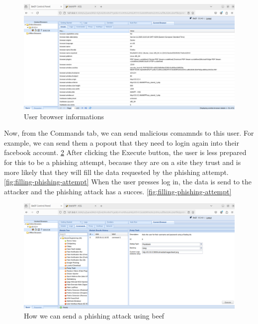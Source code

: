 \documentclass{article}
\begin{document}
\begin{figure}
    \centering
    \includegraphics[width=1\linewidth]{Figures/beef/browser-details.png}
    \caption{\label{fig:browser-details}User browser informations}
\end{figure}


Now, from the Commands tab, we can send malicious comamnds to this user. For example, we can send them a popout that they need to login again into their facebook account. \ref{fig:send-pretty-theft}
After clicking the Execute button, the user is less prepared for this to be a phishing attempt, because they are on a site they trust and is more likely that they will fill the data requested by the phishing attempt. \ref{fig:filling-phishing-attempt}
When the user presses log in, the data is send to the attacker and the phishing attack has a succes. \ref{fig:filling-phishing-attempt}


\begin{figure}
    \centering
    \includegraphics[width=1\linewidth]{Figures/beef/send-pretty-theft.png}
    \caption{\label{fig:send-pretty-theft}How we can send a phishing attack using beef}
\end{figure}
\end{document}
